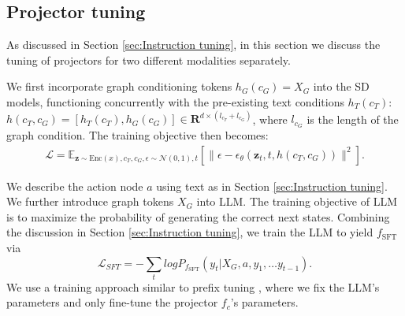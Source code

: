 

\subsection{Projector tuning} \label{sec:Projector tuning}

As discussed in Section \ref{sec:Instruction tuning}, in this section we discuss the tuning of projectors for two different modalities separately.

 We first incorporate graph conditioning tokens $h_G(c_G)=X_G$ into the SD models, functioning concurrently with the pre-existing text conditions $h_T(c_T)$: $h(c_T, c_G) = [h_T(c_T), h_G(c_G)] \in \mathbf{R}^{d \times (l_{c_T}+l_{c_G})}$, where $l_{c_G}$ is the length of the graph condition. The training objective then becomes:
\vspace{-1mm}
\begin{gather}
    \mathcal{L}=\mathbb{E}_{\mathbf{z} \sim \text{Enc}(x), c_T, c_G, \epsilon \sim \mathcal{N}(0,1), t} \left[ \|\epsilon - \epsilon_\theta(\mathbf{z}_t, t, h(c_T, c_G))\|^2 \right].
\end{gather}
\vspace{-6mm}







 We describe the action node $a$ using text as in Section \ref{sec:Instruction tuning}. We further introduce graph tokens $X_G$ into LLM.  The training objective of LLM is to maximize the probability of generating the correct next states. Combining the discussion in Section \ref{sec:Instruction tuning}, we train the LLM to yield $f_{\text{SFT}}$ via 
\vspace{-1mm}
\begin{equation}\label{eq:max}
\mathcal{L}_{SFT}=-\sum_{t}logP_{f_{\text{SFT}}}(y_t|X_G,a,y_1, \ldots y_{t-1}).
\end{equation}
We use a training approach similar to prefix tuning \citep{li2021prefix}, where we fix the LLM's parameters and only fine-tune the projector $f_c$'s parameters.




